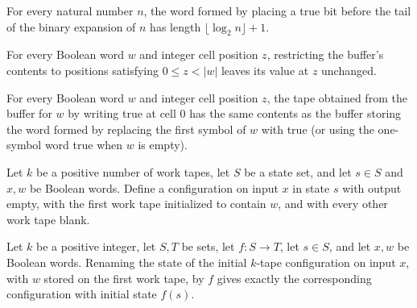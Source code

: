 \begin{lemma}
\label{Complexity.b3a_word_length}
\leanok
{}
For every natural number $n$, the word formed by placing a true bit before the tail of
the binary expansion of $n$ has length $\lfloor\log_2 n\rfloor+1$.
\end{lemma}

\begin{lemma}
\label{Complexity.b3a_buffer_restrict}
\leanok
{}
For every Boolean word $w$ and integer cell position $z$, restricting the buffer's
contents to positions satisfying $0\le z<|w|$ leaves its value at $z$ unchanged.
\end{lemma}

\begin{lemma}
\label{Complexity.b3a_buffer_overwrite}
\leanok
{}
For every Boolean word $w$ and integer cell position $z$, the tape obtained from the
buffer for $w$ by writing true at cell $0$ has the same contents as the buffer storing
the word formed by replacing the first symbol of $w$ with true (or using the one-symbol
word true when $w$ is empty).
\end{lemma}

\begin{definition}
\label{Complexity.b3a_cfg}
\leanok
{}
Let $k$ be a positive number of work tapes, let $S$ be a state set, and let $s\in S$ and
$x,w$ be Boolean words. Define a configuration on input $x$ in state $s$ with output
empty, with the first work tape initialized to contain $w$, and with every other work
tape blank.
\end{definition}

\begin{lemma}
\label{Complexity.b3a_cfg_map}
\leanok
{}
Let $k$ be a positive integer, let $S,T$ be sets, let $f:S\to T$, let $s\in S$, and let
$x,w$ be Boolean words. Renaming the state of the initial $k$-tape configuration on
input $x$, with $w$ stored on the first work tape, by $f$ gives exactly the
corresponding configuration with initial state $f(s)$.
\end{lemma}

